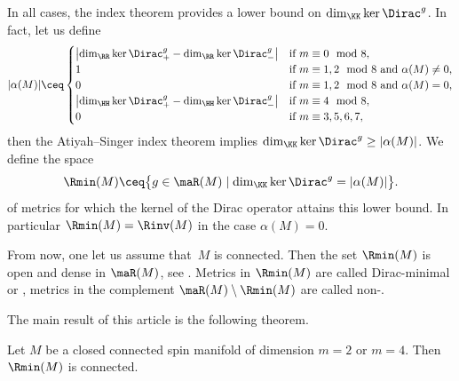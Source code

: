 In all cases, the index theorem provides a lower bound on $\dim_\KK\ker\Dirac^g$.
In fact, let us define
\[|\alpha(M)|\ceq
 \begin{cases}
 \bigl|\dim_\RR \ker\Dirac^g_+ -\dim_\RR \ker\Dirac^g_-\bigr| & \text{if}\ m\equiv0 \mod 8,\\
 1 & \text{if}\ m\equiv 1,2\mod 8 \ \text{and}\ \alpha(M)\neq 0,\\
 0 & \text{if}\ m\equiv 1,2\mod 8 \ \text{and}\ \alpha(M)= 0,\\
 \bigl|\dim_\HH \ker\Dirac^g_+ -\dim_\HH \ker\Dirac^g_-\bigr| & \text{if}\ m\equiv 4\mod 8,\\
 0 & \text{if}\ m\equiv 3,5,6,7,
 \end{cases}
\]
then the Atiyah--Singer index theorem implies $\dim_\KK\ker\Dirac^g\geq|\alpha(M)|$.
We define the space
\[
\Rmin(M) \ceq
\bigl\{g\in \maR(M) \mid \dim_\KK \ker \Dirac^{g}=|\alpha(M)| \bigr\}.
\]
of metrics for which the kernel of the Dirac operator attains this lower bound. In particular $\Rmin(M)=\Rinv(M)$ in the case $\alpha(M)=0$.

From now, one let us assume that~$M$ is connected. Then the set $\Rmin(M)$ is open and dense in $\maR(M)$, see \cite{ammann.dahl.humbert:09}. Metrics in $\Rmin(M)$ are called Dirac-minimal or \Dminimal{}, metrics in the complement $\maR(M) \setminus \Rmin(M)$ are called non-\Dminimal.

The main result of this article is the following theorem.
\begin{Theorem}\label{thm.main}
Let $M$ be a closed connected spin manifold of dimension $m=2$ or $m=4$. Then~$\Rmin(M)$ is connected.
\end{Theorem}

